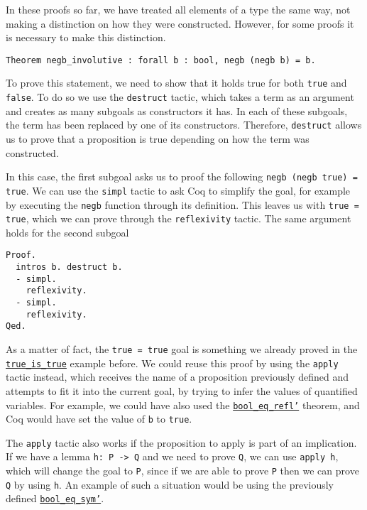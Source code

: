 In these proofs so far, we have treated all elements of a type the same way, not making a distinction on
how they were constructed. However, for some proofs it is necessary to make this distinction.

\begin{verbatim}
Theorem negb_involutive : forall b : bool, negb (negb b) = b.
\end{verbatim}

To prove this statement, we need to show that it holds true for both \texttt{true} and 
\texttt{false}. To do so we use the \texttt{destruct} tactic, which takes a term as
an argument and creates as many subgoals as constructors it has. In each of these subgoals, the term
has been replaced by one of its constructors. Therefore, \texttt{destruct} allows us to prove
that a proposition is true depending on how the term was constructed.

In this case, the first subgoal asks us to proof the following \texttt{negb (negb true) = true}.
We can use the \texttt{simpl} tactic to ask Coq to simplify the goal, for example by executing
the \texttt{negb} function through its definition. This leaves us with 
\texttt{true = true}, which we can prove through the \texttt{reflexivity} tactic. The
same argument holds for the second subgoal

\begin{verbatim}
Proof.
  intros b. destruct b.
  - simpl.
    reflexivity.
  - simpl.
    reflexivity. 
Qed.
\end{verbatim}

As a matter of fact, the \texttt{true = true} goal is something we already proved in the
\hyperref[lst:true-is-true]{\texttt{true_is_true}} example before. We could reuse this proof
by using the \texttt{apply} tactic instead, which receives the name of a proposition previously
defined and attempts to fit it into the current goal, by trying to infer the values of quantified 
variables. For example, we could have also used the 
\hyperref[lst:bool-eq-refl]{\texttt{bool_eq_refl'}} theorem, and Coq would have set the value of
\texttt{b} to \texttt{true}.

The \texttt{apply} tactic also works if the proposition to apply is part of an implication.
If we have a lemma \texttt{h: P -> Q} and we need to prove \texttt{Q}, we can use
\texttt{apply h}, which will change the goal to \texttt{P}, since if we are able to
prove \texttt{P} then we can prove \texttt{Q} by using \texttt{h}. An example
of such a situation would be using the previously defined 
\hyperref[lst:bool-eq-sym]{\texttt{bool_eq_sym'}}.

